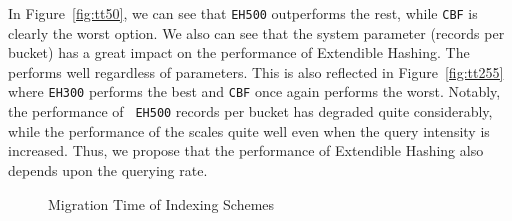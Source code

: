In Figure~\ref{fig:tt50}, we can see that {\tt EH500} outperforms the rest,
while {\tt CBF} is clearly the worst option. We also can see that the system
parameter (records per bucket) has a great impact on the performance of
Extendible Hashing. The \bptree performs well regardless of parameters. This is
also reflected in Figure~\ref{fig:tt255} where {\tt EH300} performs the best
and {\tt CBF} once again performs the worst. Notably, the performance of {\tt
EH500} records per bucket has degraded quite considerably, while the
performance of the \bptree scales quite well even when the query intensity is
increased. Thus, we propose that the performance of Extendible Hashing also
depends upon the querying rate.

\begin{figure}[htp]
\begin{center}
\end{center}
\caption{Migration Time of Indexing Schemes}
\end{figure}

